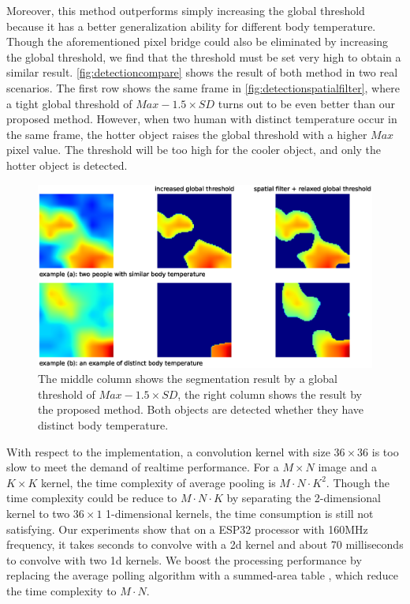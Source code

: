 Moreover, this method outperforms simply increasing the global threshold because it has a better generalization ability for different body temperature. Though the aforementioned pixel bridge could also be eliminated by increasing the global threshold, we find that the threshold must be set very high to obtain a similar result. \autoref{fig:detectioncompare} shows the result of both method in two real scenarios. The first row shows the same frame in \autoref{fig:detectionspatialfilter}, where a tight global threshold of $Max-1.5\times SD$ turns out to be even better than our proposed method. However, when two human with distinct temperature occur in the same frame, the hotter object raises the global threshold with a higher $Max$ pixel value. The threshold will be too high for the cooler object, and only the hotter object is detected.
\begin{figure}
  \centering
  \includegraphics[width=\textwidth]{figures/detect_compare.eps}
  \caption{The middle column shows the segmentation result by a global threshold of $Max-1.5\times SD$, the right column shows the result by the proposed method. Both objects are detected whether they have distinct body temperature.}\label{fig:detectioncompare}
\end{figure}

With respect to the implementation, a convolution kernel with size $36\times36$ is too slow to meet the demand of realtime performance. For a $M\times N$ image and a $K\times K$ kernel, the time complexity of average pooling is $M\cdot N\cdot K^2$. Though the time complexity could be reduce to $M\cdot N\cdot K$ by separating the 2-dimensional kernel to two $36\times 1$ 1-dimensional kernels, the time consumption is still not satisfying. Our experiments show that on a ESP32 processor with 160MHz frequency, it takes seconds to convolve with a 2d kernel and about 70 milliseconds to convolve with two 1d kernels. We boost the processing performance by replacing the average polling algorithm with a summed-area table \cite{summedareatables}, which reduce the time complexity to $M\cdot N$.

